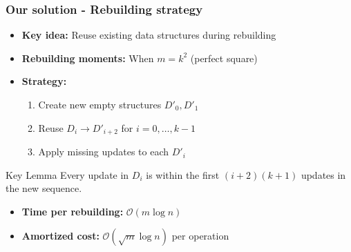 \documentclass[fleqn]{beamer}
\newcommand{\Oh}{\mathcal{O}}
\begin{document}
\begin{frame}
    \frametitle{Our solution - Rebuilding strategy}
    
    \begin{itemize}
    \item \textbf{Key idea:} Reuse existing data structures during rebuilding \vfill
    \item \textbf{Rebuilding moments:} When $m = k^2$ (perfect square) \vfill\pause
    \item \textbf{Strategy:}
        \begin{enumerate}
        \item Create new empty structures $D'_0, D'_1$
        \item Reuse $D_i \rightarrow D'_{i+2}$ for $i = 0,\ldots,k-1$
        \item Apply missing updates to each $D'_i$
        \end{enumerate} \vfill\pause
    \end{itemize}
    
    \begin{block}{Key Lemma}
        Every update in $D_i$ is within the first $(i+2)(k+1)$ updates in the new sequence.
    \end{block} \pause
    
    \begin{itemize}
    \item \textbf{Time per rebuilding:} $\Oh(m\log n)$ \vfill
    \item \textbf{Amortized cost:} $\Oh(\sqrt{m}\log n)$ per operation \vfill
    \end{itemize}
\end{frame}
\end{document}
